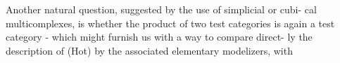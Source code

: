 Another natural question, suggested by the use of simplicial or cubi-%
cal multicomplexes, is whether the product of two test categories is again
a test category - which might furnish us with a way to compare  direct-%
ly the description of (Hot) by the associated elementary modelizers, with
